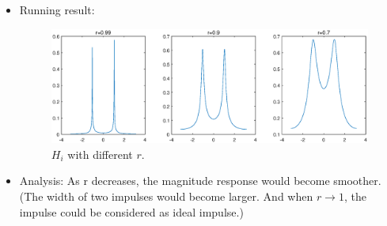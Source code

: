 \documentclass[onecolumn,oneside]{SUSTechHomework}
\begin{document}
\begin{itemize}
	\item Running result:
	\begin{figure}[H]
		\centering
		\includegraphics[width=170mm]{pictures/Hi.eps}
		\caption{$H_i$ with different $r$.}
	\end{figure}
	\item Analysis: As r decreases, the magnitude response would become smoother.
	(The width of two impulses would become larger. 
	And when $r \rightarrow 1$, the impulse could be considered as ideal impulse.)
\end{itemize}
\end{document}
